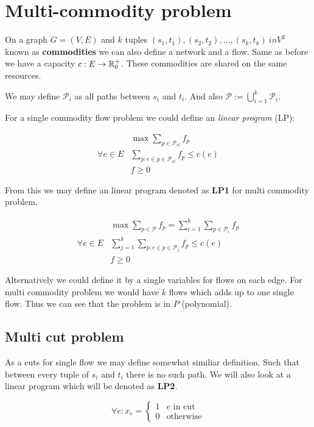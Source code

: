 \chapter{Multi-commodity problem}

On a graph $G = (V,E)$ and $k$ tuples $(s_{1}, t_{1}), (s_{2}, t_{2}), \dots, (s_{k}, t_{k}) \ in V^{2}$ known as \textbf{commodities} we can also define a network and a flow. Same as before we have a capacity $c: E \to \mathbb{R}_{0}^{+}$. These commodities are shared on the same resources.

We may define $\mathcal{P}_{i}$ as all paths between $s_{i}$ and $t_{i}$. And also $\mathcal{P} := \bigcup_{i = 1}^{k} \mathcal{P}_{i}$.

For a single commodity flow problem we could define an \textit{linear program} (LP):

$$
\begin{array}{rl}
	& \max \sum_{p \in \mathcal{P}_{st}} f_{p} \\
	\forall e \in E & \sum_{p: e \in p \in \mathcal{P}_{st}} f_{p} \leq c(e) \\
	& f \geq 0
\end{array}
$$

From this we may define an linear program denoted as \textbf{LP1} for multi commodity problem.

$$
\begin{array}{rl}
	& \max \sum_{p \in \mathcal{P}} f_{p} = \sum_{i = 1}^{k} \sum_{p \in \mathcal{P}_{i}} f_{p} \\
	\forall e \in E & \sum_{j = 1}^{k} \sum_{p: e \in p \in \mathcal{P}_{j}} f_{p} \leq c(e) \\
	& f \geq 0
\end{array}
$$

Alternatively we could define it by a single variables for flows on each edge. For multi commodity problem we would have $k$ flows which adds up to one single flow. Thus we can see that the problem is in $P$ (polynomial).

\section{Multi cut problem}

As a cuts for single flow we may define somewhat similiar definition. Such that between every tuple of $s_{i}$ and $t_{i}$ there is no such path. We will also look at a linear program which will be denoted as \textbf{LP2}.

$$
\forall e : x_{e} =
\left\{
\begin{array}{rl}
	1 & e \text{ in cut} \\
	0 & \text{otherwise}	
\end{array}
\right.
$$

